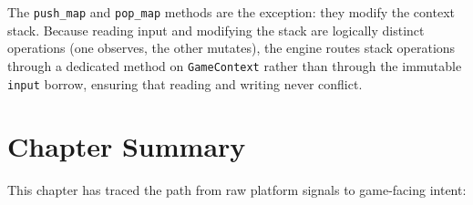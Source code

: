 \documentclass[
  11pt,
  letterpaper,
  DIV=11,
  numbers=noendperiod,
  twoside,
  open=right]{scrreprt}
\begin{document}
The \texttt{push\_map} and \texttt{pop\_map} methods are the exception:
they modify the context stack. Because reading input and modifying the
stack are logically distinct operations (one observes, the other
mutates), the engine routes stack operations through a dedicated method
on \texttt{GameContext} rather than through the immutable \texttt{input}
borrow, ensuring that reading and writing never conflict.

\section*{Chapter Summary}\label{chapter-summary-4}


This chapter has traced the path from raw platform signals to
game-facing intent:
\end{document}

